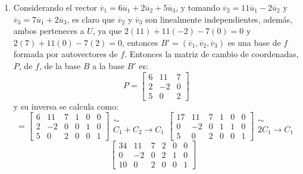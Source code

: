 \begin{solucion}
\begin{enumerate}[$a$)]
  \item Considerando el vector $\overline{v}_1 = 6\overline{u}_1 + 2\overline{u}_2 + 5\overline{u}_3$, y tomando $\overline{v}_2 = 11\overline{u}_1 - 2\overline{u}_2$ y $\overline{v}_3 = 7\overline{u}_1 + 2\overline{u}_3$, es claro que $\overline{v}_2$ y $\overline{v}_3$ son linealmente independientes, adem\'as, ambos perteneces a $U$, ya que $2(11) + 11(-2) - 7(0) = 0$ y $2(7) + 11(0) - 7(2) = 0$, entonces $B' = (\overline{v}_1, \overline{v}_2, \overline{v}_3)$ es una base de $f$ formada por autovectores de $f$. Entonces la matriz de cambio de coordenadas, $P$, de $f$, de la base $B$ a la base $B'$ es:
  \begin{equation*}
   P =
   \begin{bmatrix}
    6 & 11 & 7 \\
    2 & -2 & 0 \\
    5 &  0 & 2
   \end{bmatrix}
  \end{equation*}
  y su inversa se calcula como:
  \begin{equation*}
   [P|I] = 
   \left[
   \begin{array}{ccc|ccc}
    6 & 11 & 7 & 1 & 0 & 0 \\
    2 & -2 & 0 & 0 & 1 & 0 \\
    5 &  0 & 2 & 0 & 0 & 1 
   \end{array}
   \right]
   \begin{matrix}
    \sim \\
    C_1 + C_2 \rightarrow C_1
   \end{matrix}
   \left[
   \begin{array}{ccc|ccc}
    17 & 11 & 7 & 1 & 0 & 0 \\
     0 & -2 & 0 & 1 & 1 & 0 \\
     5 &  0 & 2 & 0 & 0 & 1 
   \end{array}
   \right]
   \begin{matrix}
    \sim \\
    2C_1 \rightarrow C_1 
   \end{matrix}
  \end{equation*}
  \begin{equation*}
   \left[
   \begin{array}{ccc|ccc}
    34 & 11 & 7 & 2 & 0 & 0 \\
     0 & -2 & 0 & 2 & 1 & 0 \\
    10 &  0 & 2 & 0 & 0 & 1 
   \end{array}
   \right]
   \begin{matrix}

\end{matrix}
\end{equation*}
\end{enumerate}
\end{solucion}
